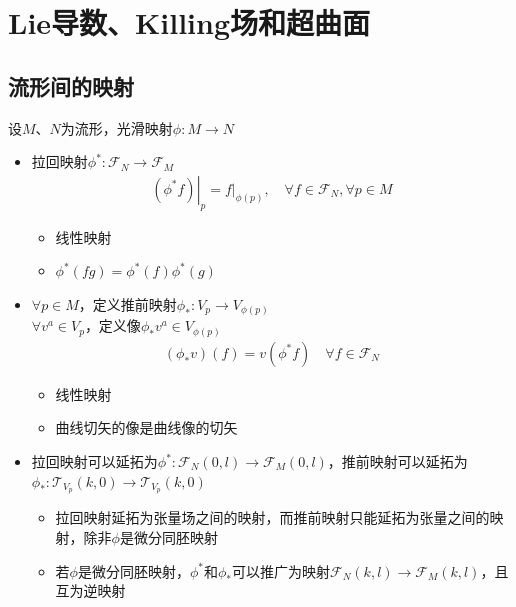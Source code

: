 \chapter{Lie导数、Killing场和超曲面}

\section{流形间的映射}

设$M$、$N$为流形，光滑映射$\phi:M \to N$
\begin{itemize}
    \item 拉回映射$\phi^{*}:\mathscr{F}_N \to \mathscr{F}_M$
    \begin{gather*}
        \left.(\phi^{*}f)\right|_p=\left.f\right|_{\phi(p)},\quad \forall f \in \mathscr{F}_N,\forall p \in M
    \end{gather*}
    \begin{itemize}
        \item 线性映射
        \item $\phi^{*}(fg)=\phi^{*}(f)\phi^{*}(g)$
    \end{itemize}
    \item $\forall p \in M$，定义推前映射$\phi_{*}:V_p \to V_{\phi(p)}$\\
    $\forall v^a \in V_p$，定义像$\phi_{*} v^a \in V_{\phi(p)}$
    \begin{gather*}
        (\phi_{*}v)(f)=v(\phi^{*}f) \quad \forall f \in \mathscr{F}_N
    \end{gather*}
    \begin{itemize}
        \item 线性映射
        \item 曲线切矢的像是曲线像的切矢
    \end{itemize}
    \item 拉回映射可以延拓为$\phi^{*}:\mathscr{F}_N(0,l) \to \mathscr{F}_M(0,l)$，推前映射可以延拓为$\phi_{*}:\mathscr{T}_{V_p}(k,0) \to \mathscr{T}_{V_p}(k,0)$
    \begin{itemize}
        \item 拉回映射延拓为张量场之间的映射，而推前映射只能延拓为张量之间的映射，除非$\phi$是微分同胚映射
        \item 若$\phi$是微分同胚映射，$\phi^{*}$和$\phi_{*}$可以推广为映射$\mathscr{F}_N(k,l) \to \mathscr{F}_M(k,l)$，且互为逆映射
    \end{itemize}
\end{itemize}

